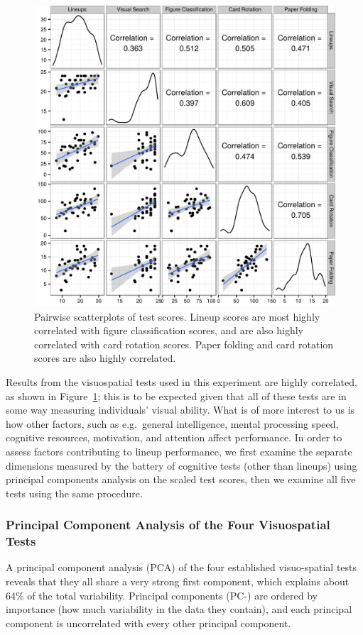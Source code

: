 \documentclass[11pt]{isuthesis}\usepackage[]{graphicx}\usepackage[]{color}
\begin{document}
\begin{figure}[ht]\centering
\includegraphics[width=.5\linewidth]{fig-VisReasoningSPM-1}
\caption{Pairwise scatterplots of test scores. Lineup scores are most highly correlated with figure classification scores, and are also highly correlated with card rotation scores. Paper folding and card rotation scores are also highly correlated.\label{fig:scatterplotmatrix}}
\end{figure}



Results from the visuospatial tests used in this experiment are highly correlated, as shown in Figure~\ref{fig:scatterplotmatrix}; this is to be expected given that all of these tests are in some way measuring individuals' visual ability. 
What is of more interest to us is how other factors, such as e.g.~general intelligence, mental processing speed, cognitive resources, motivation, and attention affect performance. 
In order to assess factors contributing to lineup performance, we first examine the separate dimensions measured by the battery of cognitive tests (other than lineups) using principal components analysis on the scaled test scores, then we examine all five tests using the same procedure. 


\subsubsection{Principal Component Analysis of the Four Visuospatial Tests}

A principal component analysis (PCA) of the four established visuo-spatial tests reveals that they all share a very strong first component, which explains about 64\% of the total variability. Principal components (PC-) are ordered by importance (how much variability in the data they contain), and each principal component is uncorrelated with every other principal component. 
\end{document}
